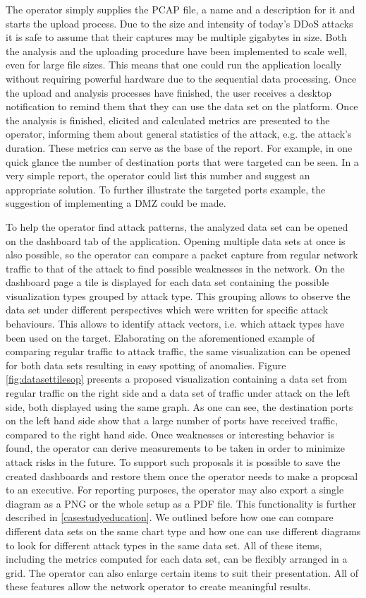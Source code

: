 The operator simply supplies the PCAP file, a name and a description for it and starts the upload process. Due to the size and intensity of today's DDoS attacks it is safe to assume that their captures may be multiple gigabytes in size. Both the analysis and the uploading procedure have been implemented to scale well, even for large file sizes. This means that one could run the application locally without requiring powerful hardware due to the sequential data processing. Once the upload and analysis processes have finished, the user receives a desktop notification to remind them that they can use the data set on the platform.
Once the analysis is finished, elicited and calculated metrics are presented to the operator, informing them about general statistics of the attack, e.g. the attack's duration. These metrics can serve as the base of the report. For example, in one quick glance the number of destination ports that were targeted can be seen. In a very simple report, the operator could list this number and suggest an appropriate solution. To further illustrate the targeted ports example, the suggestion of implementing a DMZ could be made. 

To help the operator find attack patterns, the analyzed data set can be opened on the dashboard tab of the application. Opening multiple data sets at once is also possible, so the operator can compare a packet capture from regular network traffic to that of the attack to find possible weaknesses in the network. On the dashboard page a tile is displayed for each data set containing the possible visualization types grouped by attack type. This grouping allows to observe the data set under different perspectives which were written for specific attack behaviours. This allows to identify attack vectors, i.e. which attack types have been used on the target. Elaborating on the aforementioned example of comparing regular traffic to attack traffic, the same visualization can be opened for both data sets resulting in easy spotting of anomalies. Figure  \ref{fig:datasettilesop} presents a proposed visualization containing a data set from regular traffic on the right side and a data set of traffic under attack on the left side, both displayed using the same graph. As one can see, the destination ports on the left hand side show that a large number of ports have received traffic, compared to the right hand side.
Once weaknesses or interesting behavior is found, the operator can derive measurements to be taken in order to minimize attack risks in the future. To support such proposals it is possible to save the created dashboards and restore them once the operator needs to make a proposal to an executive. For reporting purposes, the operator may also export a single diagram as a PNG or the whole setup as a PDF file. This functionality is further described in \ref{casestudyeducation}. We outlined before how one can compare different data sets on the same chart type and how one can use different diagrams to look for different attack types in the same data set. All of these items, including the metrics computed for each data set, can be flexibly arranged in a grid. The operator can also enlarge certain items to suit their presentation. All of these features allow the network operator to create meaningful results. 

